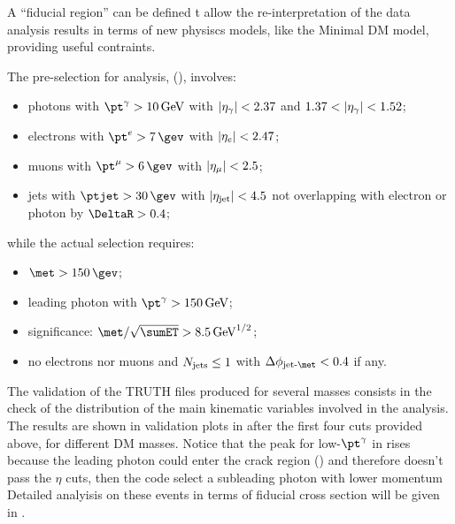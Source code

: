 A ``fiducial region'' can be defined t allow the re-interpretation of the data analysis results in terms of new physiscs models, like the Minimal DM model, providing useful contraints.
 
The pre-selection for \mph analysis, (\Sect{\ref{sec:SRselection}}), involves:
\begin{itemize}
\item photons with $\pt^\gamma>\SI{10}{\GeV}$ with $\lvert\eta_\gamma\rvert<2.37$ and $1.37<\lvert\eta_\gamma\rvert<1.52$;
\item electrons with $\pt^e>\SI{7}{\gev}$ with $\lvert\eta_e\rvert<2.47$;
\item muons with $\pt^\mu>\SI{6}{\gev}$ with $\lvert\eta_\mu\rvert<2.5$;
\item jets with $\ptjet>\SI{30}{\gev}$ with $\lvert\eta_{\textup{jet}}\rvert<4.5$ not overlapping with electron or photon by $\DeltaR > 0.4$;
\end{itemize}
while the actual selection requires:
\begin{itemize}
\item $\met>\SI{150}{\gev}$;
\item leading photon with $\pt^\gamma > \SI{150}{\GeV}$;
\item \met significance: $\met/\sqrt{\sumET} > \SI{8.5}{\GeV^{1/2}}$;
\item no electrons nor muons and $N_\textup{jets}\le 1$ with $\Delta\phi_\textup{jet-\met}<0.4$ if any.
\end{itemize}

The validation of the TRUTH files produced for several \chizero masses consists in the check of the distribution of the main kinematic variables involved in the analysis. The results are shown in validation plots in \Fig{\ref{fig:validation}} after the first four cuts provided above, for different DM masses. Notice that the peak for low-$\pt^\gamma$ in \Fig{\ref{subfig:phpt}} rises because the leading photon could enter the crack region () and therefore doesn't pass the $\eta$ cuts, then the code select a subleading photon with lower momentum
Detailed analyisis on these events in terms of fiducial cross section will be given in \Sect{\ref{sec:fid}}.

